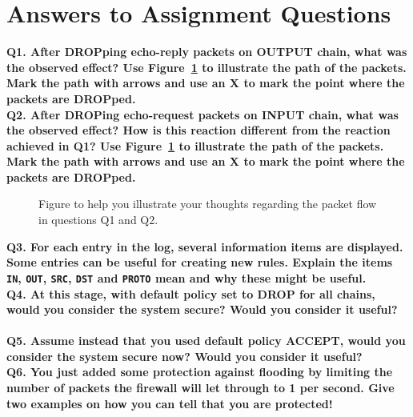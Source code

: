 \section{Answers to Assignment Questions}

\noindent \textbf{Q1. After DROPping echo-reply packets on OUTPUT chain, what 
was the observed effect? Use Figure~\ref{fig:icmpexample} to illustrate the 
path of the packets. Mark the path with arrows and use an X to mark the point 
where the packets are DROPped.}
~\ \\

\noindent \textbf{Q2. After DROPing echo-request packets on INPUT chain, what
was the observed effect? How is this reaction different from the reaction
achieved in Q1? Use Figure~\ref{fig:icmpexample} to illustrate the path of 
the
packets. Mark the path with arrows and use an X to mark the point where the
packets are DROPped.}
~\ \\

\begin{figure}[!ht]
    \begin{center}
    \end{center}
    \caption{Figure to help you illustrate your thoughts regarding the packet 
        flow in questions Q1 and Q2.}
    \label{fig:icmpexample}
\end{figure}

\noindent \textbf{Q3. For each entry in the log, several information items are
displayed. Some entries can be useful for creating new rules. Explain the 
items \texttt{IN}, \texttt{OUT}, \texttt{SRC}, \texttt{DST} and \texttt{PROTO}
mean and why these might be useful.}
~\ \\

\noindent \textbf{Q4. At this stage, with default policy set to DROP for all 
chains, would you consider the system secure? Would you consider it useful?}
~\ \\

\noindent \textbf{Q5. Assume instead that you used default policy ACCEPT, 
would you consider the system secure now? Would you consider it useful?}
~\ \\

\noindent \textbf{Q6. You just added some protection against flooding by 
limiting the number of packets the firewall will let through to 1 per second. 
Give two examples on how you can tell that you are protected!}
~\ \\
